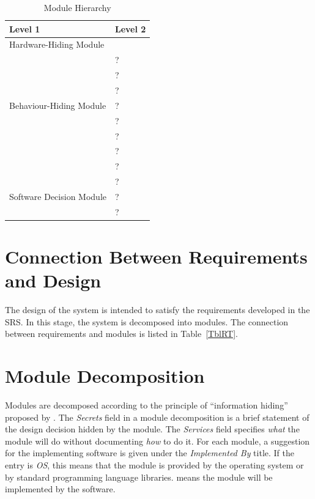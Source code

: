 \documentclass[12pt, titlepage]{article}
\begin{document}
\begin{table}[h!]
\centering
\begin{tabular}{p{} p{}}
\toprule
\textbf{Level 1} & \textbf{Level 2}\\
\midrule

{Hardware-Hiding Module} & ~ \\
\midrule

\multirow{7}{0.3\textwidth}{Behaviour-Hiding Module} & ?\\
& ?\\
& ?\\
& ?\\
& ?\\
& ?\\
& ?\\ 
& ?\\
\midrule

\multirow{3}{0.3\textwidth}{Software Decision Module} & {?}\\
& ?\\
& ?\\
\bottomrule

\end{tabular}
\caption{Module Hierarchy}
\label{TblMH}
\end{table}

\section{Connection Between Requirements and Design} \label{SecConnection}

The design of the system is intended to satisfy the requirements developed in
the SRS. In this stage, the system is decomposed into modules. The connection
between requirements and modules is listed in Table~\ref{TblRT}.



\section{Module Decomposition} \label{SecMD}

Modules are decomposed according to the principle of ``information hiding''
proposed by \citet{ParnasEtAl1984}. The \emph{Secrets} field in a module
decomposition is a brief statement of the design decision hidden by the
module. The \emph{Services} field specifies \emph{what} the module will do
without documenting \emph{how} to do it. For each module, a suggestion for the
implementing software is given under the \emph{Implemented By} title. If the
entry is \emph{OS}, this means that the module is provided by the operating
system or by standard programming language libraries.  \emph{\progname{}} means the
module will be implemented by the \progname{} software.
\end{document}
